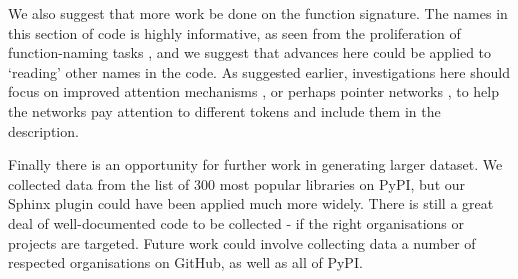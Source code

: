 We also suggest that more work be done on the function signature. The names in this section of code is highly informative, as seen from the proliferation of function-naming tasks \cite{allamanis_convolutional_2016,allamanis_learning_2017}, and we suggest that advances here could be applied to `reading' other names in the code. As suggested earlier, investigations here should focus on improved attention mechanisms \cite{niculae_regularized_2017}, or perhaps pointer networks \citep{NIPS2015_5866}, to help the networks pay attention to different tokens and include them in the description.

Finally there is an opportunity for further work in generating larger dataset. We collected data from the list of 300 most popular libraries on PyPI, but our Sphinx plugin could have been applied much more widely. There is still a great deal of well-documented code to be collected - if the right organisations or projects are targeted. Future work could involve collecting data a number of respected organisations on GitHub, as well as all of PyPI.














